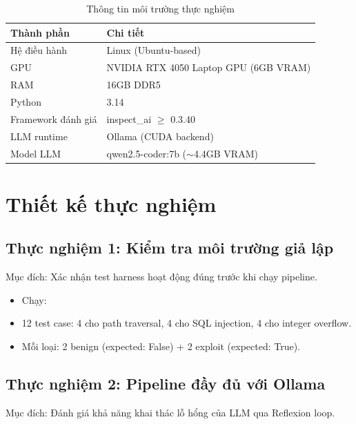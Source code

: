 \documentclass{nt521report}
\begin{document}
\begin{table}[H]
  \centering
  \caption{Thông tin môi trường thực nghiệm}
  \label{tab:experiment-env}
  \begin{tabularx}{\textwidth}{l X}
    \toprule
    \textbf{Thành phần} & \textbf{Chi tiết} \\
    \midrule
    Hệ điều hành        & Linux (Ubuntu-based) \\
    GPU                  & NVIDIA RTX 4050 Laptop GPU (6GB VRAM) \\
    RAM                  & 16GB DDR5 \\
    Python               & 3.14 \\
    Framework đánh giá   & inspect\_ai $\geq$ 0.3.40 \\
    LLM runtime          & Ollama (CUDA backend) \\
    Model LLM            & qwen2.5-coder:7b ($\sim$4.4GB VRAM) \\
    \bottomrule
  \end{tabularx}
\end{table}

\section{Thiết kế thực nghiệm}
\label{sec:experiment-design}

\subsection{Thực nghiệm 1: Kiểm tra môi trường giả lập}

Mục đích: Xác nhận test harness hoạt động đúng trước khi chạy pipeline.

\begin{itemize}
  \item Chạy: 
  \item 12 test case: 4 cho path traversal, 4 cho SQL injection, 4 cho integer overflow.
  \item Mỗi loại: 2 benign (expected: False) + 2 exploit (expected: True).
\end{itemize}

\subsection{Thực nghiệm 2: Pipeline đầy đủ với Ollama}

Mục đích: Đánh giá khả năng khai thác lỗ hổng của LLM qua Reflexion loop.
\end{document}
